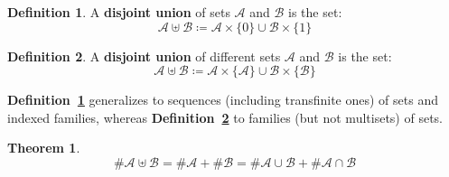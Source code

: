 \documentclass{article}
\theoremstyle{definition}
\newtheorem{definition}{Definition}
\newtheorem*{theorem}{Theorem}
\newcommand{\A}{\mathcal A}
\newcommand{\B}{\mathcal B}
\begin{document}
\begin{definition}\label{du1}
A \textbf{disjoint union} of sets $\A$ and $\B$ is the set:
\[
\A \uplus \B \coloneqq
\A \times \{0\} \cup \B \times \{1\}
\]
\end{definition}
\begin{definition}\label{du2}
A \textbf{disjoint union} of different sets $\A$ and $\B$ is the set:
\[
\A \uplus \B \coloneqq
\A \times \{\A\} \cup \B \times \{\B\}
\]
\end{definition}
\textbf{Definition~\ref{du1}} generalizes to sequences (including transfinite ones) of sets and indexed families, whereas \textbf{Definition~\ref{du2}} to families (but not multisets) of sets.
\begin{theorem}\[
\# \A \uplus \B =
\# \A + \# \B =
\# \A \cup \B + \# \A \cap \B
\]\end{theorem}
\end{document}
